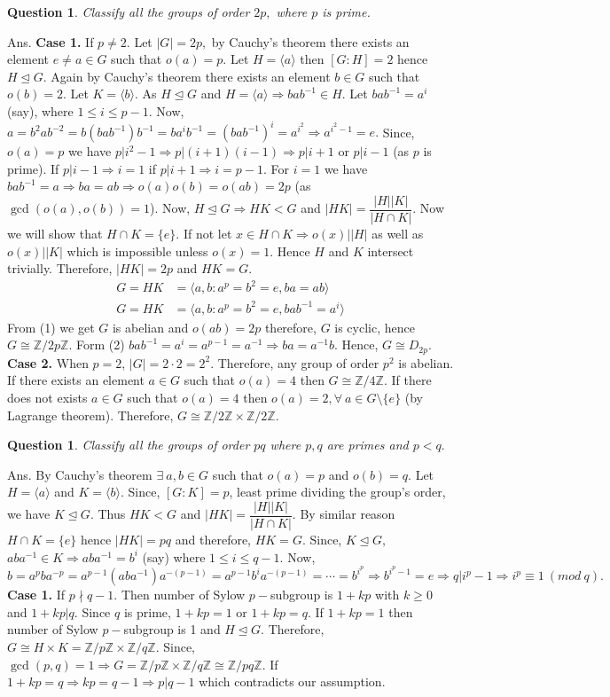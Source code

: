 \documentclass[11pt]{amsart}
\newtheorem{qns}[theorem]{Question}
\newcommand{\ZZ}{\mathbb Z}
\newcommand{\gen}[1]{\langle#1\rangle}
\begin{document}
\begin{qns}
Classify all the groups of order $2p,$ where $p$ is prime.
\end{qns}
Ans. \textbf{Case 1.} If $p\neq 2.$ Let $|G|=2p,$ by Cauchy's theorem there exists an element $e\neq a\in G$ such that $o(a)=p$. Let $H=\gen{a}$ then $[G:H]=2$ hence $H\unlhd G.$ Again by Cauchy's theorem there exists an element $b\in G$ such that $o(b)=2$. Let $K=\gen{b}.$ As $H\unlhd G$ and $H=\gen{a} \Rightarrow bab^{-1}\in H.$ Let $bab^{-1}=a^i$ (say), where $1\leq i\leq p-1.$ Now, $a=b^2ab^{-2}=b(bab^{-1})b^{-1}=ba^{i}b^{-1}=(bab^{-1})^i=a^{i^2} \Rightarrow a^{i^2-1}=e.$ Since, $o(a)=p$ we have $p\big| i^2-1\Rightarrow p\big| (i+1)(i-1) \Rightarrow p\big| i+1$ or $p\big| i-1$ (as $p$ is prime). If $p\big| i-1 \Rightarrow i=1$ if $p\big| i+1 \Rightarrow i=p-1.$ For $i=1$ we have $bab^{-1}=a \Rightarrow ba=ab \Rightarrow o(a)o(b)=o(ab)=2p$ (as $\gcd(o(a),o(b))=1$). Now, $H\unlhd G \Rightarrow HK<G$ and $|HK|=\dfrac{|H||K|}{|H\cap K|}.$ Now we will show that $H\cap K=\{e\}$. If not let $x\in H\cap K \Rightarrow o(x)\big| |H|$ as well as $o(x)\big| |K|$ which is impossible unless $o(x)=1.$ Hence $H$ and $K$ intersect trivially. Therefore, $|HK|=2p $ and $HK=G.$ \begin{align}
G=HK&=\gen{a,b:a^p=b^2=e,ba=ab}\\
G=HK&=\gen{a,b:a^p=b^2=e,bab^{-1}=a^i}
\end{align}
From (1) we get $G$ is abelian and $o(ab)=2p$ therefore, $G$ is cyclic, hence $G\cong {\ZZ}/2p{\ZZ}.$ Form (2) $bab^{-1}=a^i=a^{p-1}=a^{-1} \Rightarrow ba=a^{-1}b$. Hence, $G\cong D_{2p}.$\\
\textbf{Case 2.} When $p=2$, $|G|=2\cdot 2=2^2$. Therefore, any group of order $p^2$ is abelian. If there exists an element $a\in G$ such that $o(a)=4$ then $G\cong {\ZZ}/4{\ZZ}.$ If there does not exists $a\in G$ such that $o(a)=4$ then $o(a)=2,\forall~a\in G\setminus \{e\}$ (by Lagrange theorem). Therefore, $G\cong {\ZZ}/2{\ZZ}\times {\ZZ}/2{\ZZ}.$
\begin{qns}
Classify all the groups of order $pq$ where $p,q$ are primes and $p<q.$
\end{qns}
Ans. By Cauchy's theorem $\exists~a,b\in G$ such that $o(a)=p$ and $o(b)=q.$ Let $H=\gen{a}$ and $K=\gen{b}.$ Since, $[G:K]=p$, least prime dividing the group's order, we have $K\unlhd G.$ Thus $HK<G$ and $|HK|=\dfrac{|H||K|}{|H\cap K|}.$ By similar reason $H\cap K=\{e\}$ hence $|HK|=pq$ and therefore, $HK=G.$ Since, $K\unlhd G,$ $aba^{-1}\in K \Rightarrow aba^{-1}=b^i$ (say) where $1\leq i\leq q-1.$ Now, $b=a^pba^{-p}=a^{p-1}(aba^{-1})a^{-(p-1)}=a^{p-1}b^ia^{-(p-1)}=\cdots=b^{i^p} \Rightarrow b^{i^p-1}=e \Rightarrow q\big| i^p-1 \Rightarrow i^p\equiv 1~(mod~q).$\\
\textbf{Case 1.} If $p\nmid q-1$. Then number of Sylow $p-$subgroup is $1+kp$ with $k\geq 0$ and $1+kp\big| q.$ Since $q$ is prime, $1+kp=1$ or $1+kp=q$. If $1+kp=1$ then number of Sylow $p-$subgroup is 1 and $H\unlhd G.$ Therefore, $G\cong H\times K={\ZZ}/p{\ZZ}\times {\ZZ}/q{\ZZ}.$ Since, $\gcd(p,q)=1 \Rightarrow G={\ZZ}/p{\ZZ}\times {\ZZ}/q{\ZZ}\cong {\ZZ}/pq{\ZZ}.$ If $1+kp=q \Rightarrow kp=q-1 \Rightarrow p\big| q-1$ which contradicts our assumption.
\end{document}
